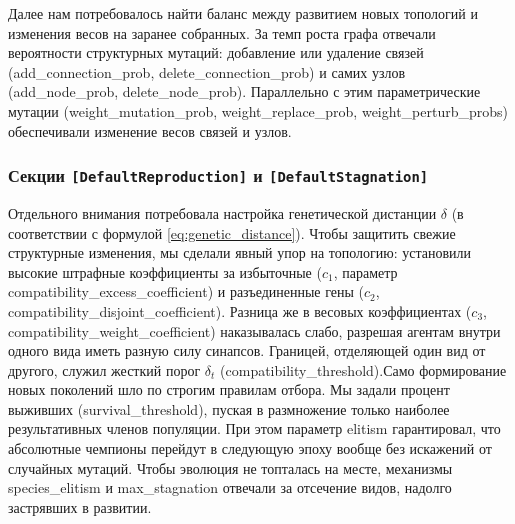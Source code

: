 Далее нам потребовалось найти баланс между развитием новых топологий и изменения весов на заранее собранных. За темп роста графа отвечали вероятности структурных мутаций: добавление или удаление связей (add\_connection\_prob, delete\_connection\_prob) и самих узлов (add\_node\_prob, delete\_node\_prob). Параллельно с этим параметрические мутации (weight\_mutation\_prob, weight\_replace\_prob, weight\_perturb\_probs) обеспечивали изменение весов связей и узлов.

\subsubsection{Секции \texttt{[DefaultReproduction]} и \texttt{[DefaultStagnation]}}

Отдельного внимания потребовала настройка генетической дистанции $\delta$ (в соответствии с формулой \ref{eq:genetic_distance}). Чтобы защитить свежие структурные изменения, мы сделали явный упор на топологию: установили высокие штрафные коэффициенты за избыточные ($c_1$, параметр compatibility\_excess\_coefficient) и разъединенные гены ($c_2$, compatibility\_disjoint\_coefficient). Разница же в весовых коэффициентах ($c_3$, compatibility\_weight\_coefficient) наказывалась слабо, разрешая агентам внутри одного вида иметь разную силу синапсов. Границей, отделяющей один вид от другого, служил жесткий порог $\delta_t$ (compatibility\_threshold).Само формирование новых поколений шло по строгим правилам отбора. Мы задали процент выживших (survival\_threshold), пуская в размножение только наиболее результативных членов популяции. При этом параметр elitism гарантировал, что абсолютные чемпионы перейдут в следующую эпоху вообще без искажений от случайных мутаций. Чтобы эволюция не топталась на месте, механизмы species\_elitism и max\_stagnation отвечали за отсечение видов, надолго застрявших в развитии.